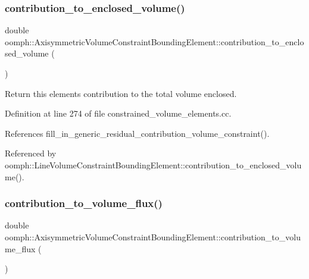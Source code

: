 \subsubsection{\texorpdfstring{contribution\+\_\+to\+\_\+enclosed\+\_\+volume()}{contribution\_to\_enclosed\_volume()}}
{\footnotesize\ttfamily double oomph\+::\+Axisymmetric\+Volume\+Constraint\+Bounding\+Element\+::contribution\+\_\+to\+\_\+enclosed\+\_\+volume (\begin{DoxyParamCaption}{ }\end{DoxyParamCaption})}



Return this element\textquotesingle{}s contribution to the total volume enclosed. 



Definition at line 274 of file constrained\+\_\+volume\+\_\+elements.\+cc.



References fill\+\_\+in\+\_\+generic\+\_\+residual\+\_\+contribution\+\_\+volume\+\_\+constraint().



Referenced by oomph\+::\+Line\+Volume\+Constraint\+Bounding\+Element\+::contribution\+\_\+to\+\_\+enclosed\+\_\+volume().

\mbox{\label{classoomph_1_1AxisymmetricVolumeConstraintBoundingElement_a746f88f325d61610e10e97465fd2ca09}} 
\subsubsection{\texorpdfstring{contribution\+\_\+to\+\_\+volume\+\_\+flux()}{contribution\_to\_volume\_flux()}}
{\footnotesize\ttfamily double oomph\+::\+Axisymmetric\+Volume\+Constraint\+Bounding\+Element\+::contribution\+\_\+to\+\_\+volume\+\_\+flux (\begin{DoxyParamCaption}{ }\end{DoxyParamCaption})\hspace{0.3cm}{\ttfamily [inline]}}



